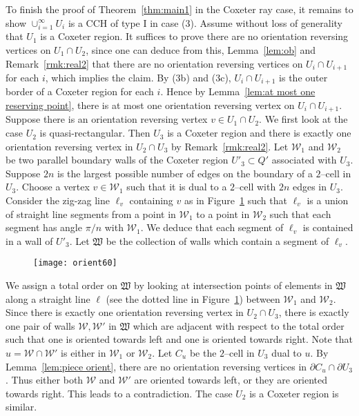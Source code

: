 \documentclass[11pt]{amsart}
\newcommand {\W}{\mathcal W}
\theoremstyle{definition}
\begin{document}
To finish the proof of Theorem~\ref{thm:main1} in the Coxeter ray case, it remains to show $\cup_{i=1}^{\infty}U_i$ is a CCH of type I in case (3). Assume without loss of generality that $U_1$ is a Coxeter region. It suffices to prove there are no orientation reversing vertices on $U_1\cap U_2$, since one can deduce from this, Lemma~\ref{lem:ob} and Remark~\ref{rmk:real2} that there are no orientation reversing vertices on $U_i\cap U_{i+1}$ for each $i$, which implies the claim. By (3b) and (3c), $U_i\cap U_{i+1}$ is the outer border of a Coxeter region for each $i$. Hence by Lemma~\ref{lem:at most one reserving point}, there is at most one orientation reversing vertex on $U_i\cap U_{i+1}$. Suppose there is an orientation reversing vertex $v\in U_1\cap U_2$. We first look at the case $U_2$ is quasi-rectangular. Then $U_3$ is a Coxeter region and there is exactly one orientation reversing vertex in $U_2\cap U_3$ by Remark~\ref{rmk:real2}. Let $\W_1$ and $\W_2$ be two parallel boundary walls of the Coxeter region $U'_3\subset Q'$ associated with $U_3$. Suppose $2n$ is the largest possible number of edges on the boundary of a $2$--cell in $U_3$. Choose a vertex $v\in\W_1$ such that it is dual to a $2$--cell with $2n$ edges in $U_3$. Consider the zig-zag line $\ell_v$ containing $v$ as in Figure~\ref{f:orient60} such that $\ell_v$ is a union of straight line segments from a point in $\W_1$ to a point in $\W_2$ such that each segment has angle $\pi/n$ with $\W_1$. We deduce that each segment of $\ell_v$ is contained in a wall of $U'_3$. Let $\mathfrak{W}$ be the collection of walls which contain a segment of $\ell_v$. 
\begin{figure}[h!]
	\centering
	\texttt{[image: orient60]}
	\caption{}
	\label{f:orient60}
\end{figure}
We assign a total order on $\mathfrak{W}$ by looking at intersection points of elements in $\mathfrak{W}$ along a straight line $\ell$ (see the dotted line in Figure~\ref{f:orient60}) between $\W_1$ and $\W_2$. Since there is exactly one orientation reversing vertex in $U_2\cap U_3$, there is exactly one pair of walls $\W,\W'$ in $\mathfrak{W}$ which are adjacent with respect to the total order such that one is oriented towards left and one is oriented towards right. Note that $u=\W\cap\W'$ is either in $\W_1$ or $\W_2$. Let $C_u$ be the $2$--cell in $U_3$ dual to $u$. By Lemma~\ref{lem:piece orient}, there are no orientation reversing vertices in $\partial C_u\cap\partial U_3$. Thus either both $\W$ and $\W'$ are oriented towards left, or they are oriented towards right. This leads to a contradiction. The case $U_2$ is a Coxeter region is similar.
\end{document}
